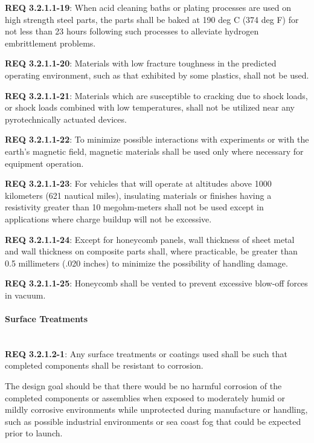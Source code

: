 \documentclass[12pt]{article}
\begin{document}
\noindent \textbf{REQ 3.2.1.1-19}: When acid cleaning baths or plating processes are used on high strength steel parts, the parts shall be baked at 190 deg C (374 deg F) for not less than 23 hours following such processes to alleviate hydrogen embrittlement problems.

\noindent \textbf{REQ 3.2.1.1-20}: Materials with low fracture toughness in the predicted operating environment, such as that exhibited by some plastics, shall not be used. 

\noindent \textbf{REQ 3.2.1.1-21}: Materials which are susceptible to cracking due to shock loads, or shock loads combined with low temperatures, shall not be utilized near any pyrotechnically actuated devices.

\noindent \textbf{REQ 3.2.1.1-22}: To minimize possible interactions with experiments or with the earth's magnetic field, magnetic materials shall be used only where necessary for equipment operation. 

\noindent \textbf{REQ 3.2.1.1-23}: For vehicles that will operate at altitudes above 1000 kilometers (621 nautical miles), insulating materials or finishes having a resistivity greater than 10 megohm-meters shall not be used except in applications where charge buildup will not be excessive. 

\noindent \textbf{REQ 3.2.1.1-24}: Except for honeycomb panels, wall thickness of sheet metal and wall thickness on composite parts shall, where practicable, be greater than 0.5 millimeters (.020 inches) to minimize the possibility of handling damage. 

\noindent \textbf{REQ 3.2.1.1-25}: Honeycomb shall be vented to prevent excessive blow-off forces in vacuum.


\paragraph{Surface Treatments} \mbox{} \\ %
\noindent \textbf{REQ 3.2.1.2-1}: Any surface treatments or coatings used shall be such that completed components shall be resistant to corrosion. 

The design goal should be that there would be no harmful corrosion of the completed components or assemblies when exposed to moderately humid or mildly corrosive environments while unprotected during manufacture or handling, such as possible industrial environments or sea coast fog that could be expected prior to launch. 
\end{document}
